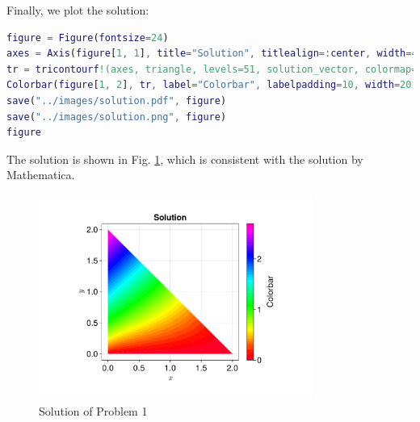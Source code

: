 Finally, we plot the solution:
\begin{lstlisting}[language=matlab]
figure = Figure(fontsize=24)
axes = Axis(figure[1, 1], title="Solution", titlealign=:center, width=400, height=400, xlabel=L"$x$", ylabel=L"$y$")
tr = tricontourf!(axes, triangle, levels=51, solution_vector, colormap=:gist_rainbow)
Colorbar(figure[1, 2], tr, label="Colorbar", labelpadding=10, width=20, height=400)
save("../images/solution.pdf", figure)
save("../images/solution.png", figure)
figure
\end{lstlisting}

The solution is shown in Fig. \ref{fig:solution},
which is consistent with the solution by Mathematica.
\begin{figure}[H]
    \centering
    \includegraphics[width=0.8\textwidth]{../problem1/images/solution.pdf}
    \caption{Solution of Problem 1}
    \label{fig:solution}
\end{figure}